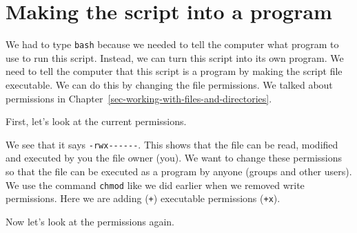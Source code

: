 \documentclass[
  letterpaper,
  DIV=11,
  numbers=noendperiod]{scrreprt}
\newenvironment{Shaded}{\begin{snugshade}}{\end{snugshade}}
\newcommand{\AttributeTok}[1]{\textcolor[rgb]{0.40,0.45,0.13}{#1}}
\newcommand{\ExtensionTok}[1]{\textcolor[rgb]{0.00,0.23,0.31}{#1}}
\newcommand{\NormalTok}[1]{\textcolor[rgb]{0.00,0.23,0.31}{#1}}
\newcommand{\PreprocessorTok}[1]{\textcolor[rgb]{0.68,0.00,0.00}{#1}}
\newcommand{\SpecialStringTok}[1]{\textcolor[rgb]{0.13,0.47,0.30}{#1}}
\begin{document}
\section{\texorpdfstring{\textbf{Making the script into a
program}}{Making the script into a program}}\label{making-the-script-into-a-program}

We had to type \texttt{bash} because we needed to tell the computer what
program to use to run this script. Instead, we can turn this script into
its own program. We need to tell the computer that this script is a
program by making the script file executable. We can do this by changing
the file permissions. We talked about permissions in
Chapter~\ref{sec-working-with-files-and-directories}.

First, let's look at the current permissions.

\begin{Shaded}
\end{Shaded}

We see that it says \texttt{-rwx-\/-\/-\/-\/-\/-}. This shows that the
file can be read, modified and executed by you the file owner (you). We
want to change these permissions so that the file can be executed as a
program by anyone (groups and other users). We use the command
\texttt{chmod} like we did earlier when we removed write permissions.
Here we are adding (\texttt{+}) executable permissions (\texttt{+x}).

\begin{Shaded}
\end{Shaded}

Now let's look at the permissions again.

\begin{Shaded}
\end{Shaded}
\end{document}
